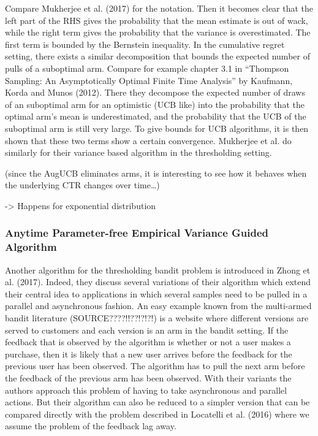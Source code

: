\documentclass[12pt,]{article}
\begin{document}
Compare Mukherjee et al. (2017) for the notation. Then it becomes clear
that the left part of the RHS gives the probability that the mean
estimate is out of wack, while the right term gives the probability that
the variance is overestimated. The first term is bounded by the
Bernstein inequality. In the cumulative regret setting, there exists a
similar decomposition that bounds the expected number of pulls of a
suboptimal arm. Compare for example chapter 3.1 in ``Thompson Sampling:
An Asymptotically Optimal Finite Time Analysis'' by Kaufmann, Korda and
Munos (2012). There they decompose the expected number of draws of an
suboptimal arm for an optimistic (UCB like) into the probability that
the optimal arm's mean is underestimated, and the probability that the
UCB of the suboptimal arm is still very large. To give bounds for UCB
algorithms, it is then shown that these two terms show a certain
convergence. Mukherjee et al. do similarly for their variance based
algorithm in the thresholding setting.

(since the AugUCB eliminates arms, it is interesting to see how it
behaves when the underlying CTR changes over time\ldots{})

-\textgreater{} Happens for exponential distribution

\subsubsection{Anytime Parameter-free Empirical Variance Guided
Algorithm}\label{anytime-parameter-free-empirical-variance-guided-algorithm}

Another algorithm for the thresholding bandit problem is introduced in
Zhong et al. (2017). Indeed, they discuss several variations of their
algorithm which extend their central idea to applications in which
several samples need to be pulled in a parallel and asynchronous
fashion. An easy example known from the multi-armed bandit literature
(SOURCE????!!??!?!?!) is a website where different versions are served
to customers and each version is an arm in the bandit setting. If the
feedback that is observed by the algorithm is whether or not a user
makes a purchase, then it is likely that a new user arrives before the
feedback for the previous user has been observed. The algorithm has to
pull the next arm before the feedback of the previous arm has been
observed. With their variants the authors approach this problem of
having to take asynchronous and parallel actions. But their algorithm
can also be reduced to a simpler version that can be compared directly
with the problem described in Locatelli et al. (2016) where we assume
the problem of the feedback lag away.
\end{document}
